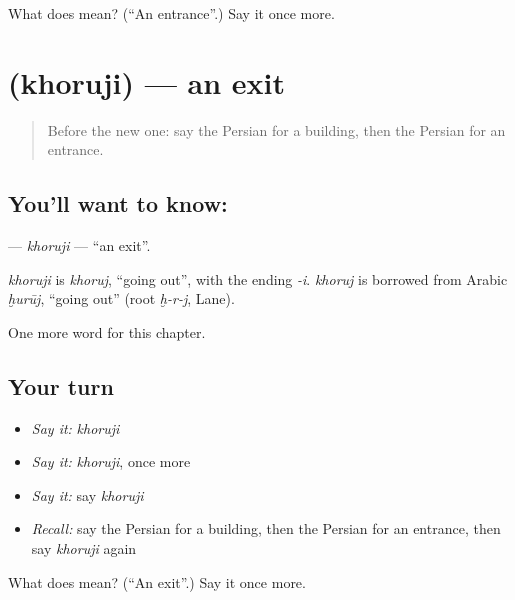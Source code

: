 \begin{tcolorbox}[breakable,colback=teal!4,colframe=teal!35!black,title={Before you move on}]
What does  mean? (\textquotedblleft{}An entrance\textquotedblright{}.) Say it once more.
\end{tcolorbox}
\section[\texorpdfstring{\fa{خروجی} (khoruji)}{خروجی (khoruji)}]{ (khoruji) — an exit}

\label{lesson:FA-C266-khoruji}



\begin{quote}
Before the new one: say the Persian for a building, then the Persian for an entrance.
\end{quote}

\subsection*{You'll want to know: }
\textbf{} — \emph{khoruji} — \textquotedblleft{}an exit\textquotedblright{}.

\begin{cousinweb}
\emph{khoruji} is \emph{khoruj}, \textquotedblleft{}going out\textquotedblright{}, with the ending \emph{-i}. \emph{khoruj} is borrowed from Arabic \emph{ḫurūj}, \textquotedblleft{}going out\textquotedblright{} (root \emph{ḫ-r-j}, Lane).
\end{cousinweb}

\begin{grammarlens}[title={What you've built}]
One more word for this chapter.
\end{grammarlens}

\subsection*{Your turn}
\begin{itemize}
\raggedright
  \item \emph{Say it:} \emph{khoruji}
  \item \emph{Say it:} \emph{khoruji}, once more
  \item \emph{Say it:} say \emph{khoruji}
  \item \emph{Recall:} say the Persian for a building, then the Persian for an entrance, then say \emph{khoruji} again
\end{itemize}

\begin{tcolorbox}[breakable,colback=teal!4,colframe=teal!35!black,title={Before you move on}]
What does  mean? (\textquotedblleft{}An exit\textquotedblright{}.) Say it once more.
\end{tcolorbox}
